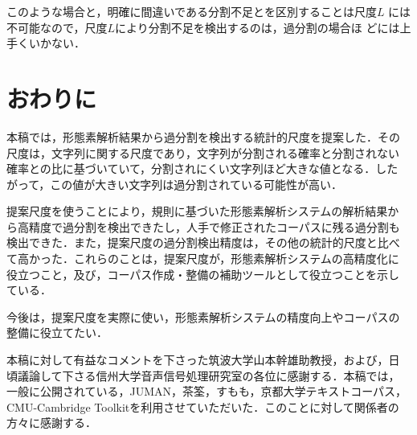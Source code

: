 このような場合と，明確に間違いである分割不足とを区別することは尺度$L$
には不可能なので，尺度$L$により分割不足を検出するのは，過分割の場合ほ
どには上手くいかない．

\section{おわりに}
\label{sec:conclusion}

本稿では，形態素解析結果から過分割を検出する統計的尺度を提案した．その
尺度は，文字列に関する尺度であり，文字列が分割される確率と分割されない
確率との比に基づいていて，分割されにくい文字列ほど大きな値となる．した
がって，この値が大きい文字列は過分割されている可能性が高い．

提案尺度を使うことにより，規則に基づいた形態素解析システムの解析結果か
ら高精度で過分割を検出できたし，人手で修正されたコーパスに残る過分割も
検出できた．また，提案尺度の過分割検出精度は，その他の統計的尺度と比べ
て高かった．これらのことは，提案尺度が，形態素解析システムの高精度化に
役立つこと，及び，コーパス作成・整備の補助ツールとして役立つことを示し
ている．

今後は，提案尺度を実際に使い，形態素解析システムの精度向上やコーパスの
整備に役立てたい．


\acknowledgment

本稿に対して有益なコメントを下さった筑波大学山本幹雄助教授，および，日
頃議論して下さる信州大学音声信号処理研究室の各位に感謝する．本稿では，
一般に公開されている，JUMAN，茶筌，すもも，京都大学テキストコーパス，
CMU-Cambridge Toolkitを利用させていただいた．このことに対して関係者の
方々に感謝する．

\appendix


 



\begin{biography}

\end{biography}


